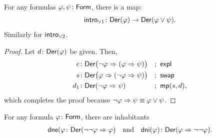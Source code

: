 \begin{lem}
    \label{lem:intro-or-1}
    For any formulas $\varphi, \psi \colon \fun{Form}$, there is a map:
    \[
        \fun{intro}_{\lor 1}\colon
            \fun{Der}(\varphi)
            \to
            \fun{Der}(\varphi\lor\psi).
    \]
    Similarly for $\mathsf{intro}_{\lor2}$.
\end{lem}

\begin{proof}
    Let $d\colon\fun{Der}(\varphi)$ be given. Then,
    \begin{align*}
        e&\colon\fun{Der}\big(
            \neg\varphi\imp(\varphi\imp\psi)
        \big)
            &&;\ \fun{expl}\\
        s&\colon\fun{Der}\big(
            \varphi\imp(\neg\varphi\imp\psi)
        \big)
            &&;\ \fun{swap}\\
        d_1&\colon\fun{Der}(\neg\varphi\imp\psi)
            &&;\ \fun{mp}(s,d),
    \end{align*}
    which completes the proof because $\neg\varphi\mathrel{\Rightarrow}\psi\equiv\varphi\lor\psi$.
\end{proof}

\begin{lem}
    \label{lem:double-negation}
    For any formula\/ $\varphi\colon\fun{Form}$, there are inhabitants 
    \begin{align*}
        \fun{dne}(\varphi\colon
            \fun{Der}(\neg\neg\varphi\imp\varphi)
    \quad\text{and}\quad
        \fun{dni}(\varphi)\colon
            \fun{Der}(\varphi\imp\neg\neg\varphi).
    \end{align*}
\end{lem}

